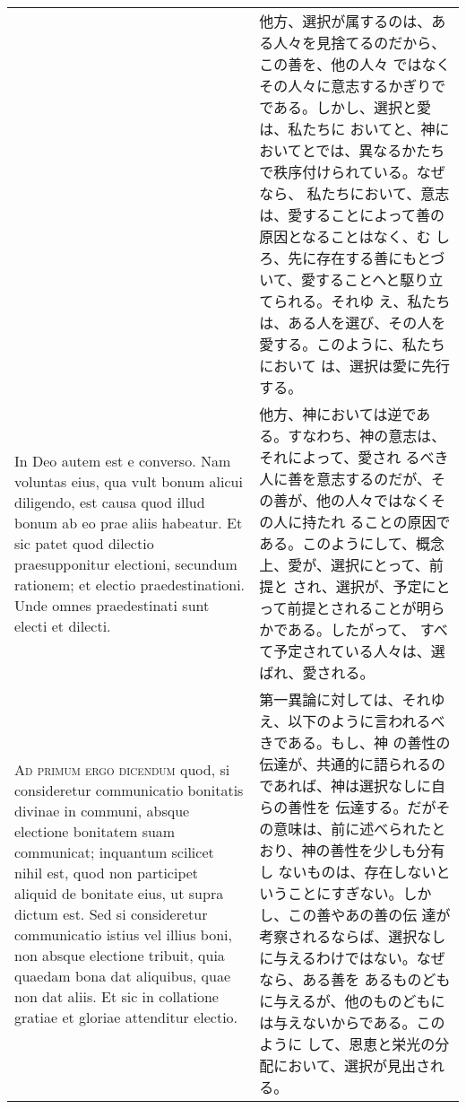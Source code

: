 \documentclass[10pt]{jsarticle} %
\begin{document}
\begin{longtable}{p{21em}p{21em}}
&

他方、選択が属するのは、ある人々を見捨てるのだから、この善を、他の人々
ではなくその人々に意志するかぎりでである。しかし、選択と愛は、私たちに
おいてと、神においてとでは、異なるかたちで秩序付けられている。なぜなら、
私たちにおいて、意志は、愛することによって善の原因となることはなく、む
しろ、先に存在する善にもとづいて、愛することへと駆り立てられる。それゆ
え、私たちは、ある人を選び、その人を愛する。このように、私たちにおいて
は、選択は愛に先行する。


\\


In Deo autem
 est e converso. Nam voluntas eius, qua vult bonum alicui diligendo, est
 causa quod illud bonum ab eo prae aliis habeatur. Et sic patet quod
 dilectio praesupponitur electioni, secundum rationem; et electio
 praedestinationi. Unde omnes praedestinati sunt electi et dilecti.


&

他方、神においては逆である。すなわち、神の意志は、それによって、愛され
るべき人に善を意志するのだが、その善が、他の人々ではなくその人に持たれ
ることの原因である。このようにして、概念上、愛が、選択にとって、前提と
され、選択が、予定にとって前提とされることが明らかである。したがって、
すべて予定されている人々は、選ばれ、愛される。


\\



{\scshape Ad primum ergo dicendum} quod, si consideretur
 communicatio bonitatis divinae in communi, absque electione bonitatem
 suam communicat; inquantum scilicet nihil est, quod non participet
 aliquid de bonitate eius, ut supra dictum est. Sed si consideretur
 communicatio istius vel illius boni, non absque electione tribuit, quia
 quaedam bona dat aliquibus, quae non dat aliis. Et sic in collatione
 gratiae et gloriae attenditur electio.


&

第一異論に対しては、それゆえ、以下のように言われるべきである。もし、神
の善性の伝達が、共通的に語られるのであれば、神は選択なしに自らの善性を
伝達する。だがその意味は、前に述べられたとおり、神の善性を少しも分有し
ないものは、存在しないということにすぎない。しかし、この善やあの善の伝
達が考察されるならば、選択なしに与えるわけではない。なぜなら、ある善を
あるものどもに与えるが、他のものどもには与えないからである。このように
して、恩恵と栄光の分配において、選択が見出される。


\\




\end{longtable}
\end{document}
